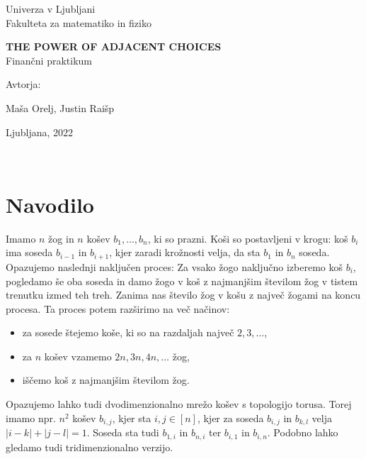 \documentclass[a4paper, 11pt]{article}
\begin{document}
\thispagestyle{empty}
\begin{center}
\begin{minipage}{0.75\linewidth}
    \centering
    {\Large Univerza v Ljubljani \\ Fakulteta za matematiko in fiziko}
    \\
    \vspace{7cm}

    {\uppercase{\Large \textbf{The power of adjacent choices}}} \\ Finančni praktikum \\
    \vspace{3cm}

    Avtorja:\\
    {\Large Maša Orelj, Justin Raišp\par}
    \vspace{7cm}

    {\Large Ljubljana, 2022}
\end{minipage}
\end{center}


\newpage
\tableofcontents
\newpage
\
\section{Navodilo}

Imamo $n$ žog in $n$ košev $b_1, \dots , b_n$, ki so prazni. Koši so postavljeni v krogu: koš $b_i$ ima soseda 
$b_{i-1}$ in $b_{i+1}$, kjer zaradi krožnosti velja, da sta $b_1$ in $b_n$ soseda.
Opazujemo naslednji naključen proces: Za vsako žogo naključno izberemo koš $b_i$, pogledamo še oba soseda in damo žogo 
v koš z najmanjšim številom žog v tistem trenutku izmed teh treh. Zanima nas število žog v košu z največ žogami na koncu procesa. 
Ta proces potem razširimo na več načinov:
\begin{itemize}
    \item za sosede štejemo koše, ki so na razdaljah največ $2, 3, \dots$,
    \item za $n$ košev vzamemo $2n, 3n, 4n, \dots$ žog,
    \item iščemo koš z najmanjšim številom žog.
\end{itemize}  
Opazujemo lahko tudi dvodimenzionalno mrežo košev s topologijo torusa. Torej imamo npr. $n^2$ košev $b_{i,j}$, kjer sta 
$i, j \in [n]$, kjer za soseda $b_{i,j}$ in $b_{k,l}$ velja $|i - k| + |j - l| = 1$. Soseda sta tudi
$b_{1,i}$ in $b_{n,i}$  ter $b_{i,1}$ in $b_{i,n}$. Podobno lahko gledamo tudi tridimenzionalno verzijo.
\end{document}

